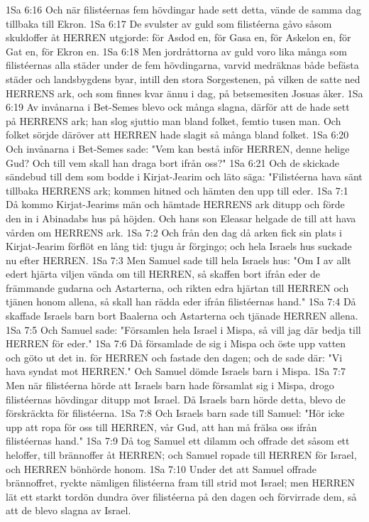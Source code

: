 1Sa 6:16  Och när filistéernas fem hövdingar hade sett detta, vände de samma dag tillbaka till Ekron.
1Sa 6:17  De svulster av guld som filistéerna gåvo såsom skuldoffer åt HERREN utgjorde: för Asdod en, för Gasa en, för Askelon en, för Gat en, för Ekron en.
1Sa 6:18  Men jordråttorna av guld voro lika många som filistéernas alla städer under de fem hövdingarna, varvid medräknas både befästa städer och landsbygdens byar, intill den stora Sorgestenen, på vilken de satte ned HERRENS ark, och som finnes kvar ännu i dag, på betsemesiten Josuas åker.
1Sa 6:19  Av invånarna i Bet-Semes blevo ock många slagna, därför att de hade sett på HERRENS ark; han slog sjuttio man bland folket, femtio tusen man. Och folket sörjde däröver att HERREN hade slagit så många bland folket.
1Sa 6:20  Och invånarna i Bet-Semes sade: "Vem kan bestå inför HERREN, denne helige Gud? Och till vem skall han draga bort ifrån oss?"
1Sa 6:21  Och de skickade sändebud till dem som bodde i Kirjat-Jearim och läto säga: "Filistéerna hava sänt tillbaka HERRENS ark; kommen hitned och hämten den upp till eder.
1Sa 7:1  Då kommo Kirjat-Jearims män och hämtade HERRENS ark ditupp och förde den in i Abinadabs hus på höjden. Och hans son Eleasar helgade de till att hava vården om HERRENS ark.
1Sa 7:2  Och från den dag då arken fick sin plats i Kirjat-Jearim förflöt en lång tid: tjugu år förgingo; och hela Israels hus suckade nu efter HERREN.
1Sa 7:3  Men Samuel sade till hela Israels hus: "Om I av allt edert hjärta viljen vända om till HERREN, så skaffen bort ifrån eder de främmande gudarna och Astarterna, och rikten edra hjärtan till HERREN och tjänen honom allena, så skall han rädda eder ifrån filistéernas hand."
1Sa 7:4  Då skaffade Israels barn bort Baalerna och Astarterna och tjänade HERREN allena.
1Sa 7:5  Och Samuel sade: "Församlen hela Israel i Mispa, så vill jag där bedja till HERREN för eder."
1Sa 7:6  Då församlade de sig i Mispa och öste upp vatten och göto ut det in. för HERREN och fastade den dagen; och de sade där: "Vi hava syndat mot HERREN." Och Samuel dömde Israels barn i Mispa.
1Sa 7:7  Men när filistéerna hörde att Israels barn hade församlat sig i Mispa, drogo filistéernas hövdingar ditupp mot Israel. Då Israels barn hörde detta, blevo de förskräckta för filistéerna.
1Sa 7:8  Och Israels barn sade till Samuel: "Hör icke upp att ropa för oss till HERREN, vår Gud, att han må frälsa oss ifrån filistéernas hand."
1Sa 7:9  Då tog Samuel ett dilamm och offrade det såsom ett heloffer, till brännoffer åt HERREN; och Samuel ropade till HERREN för Israel, och HERREN bönhörde honom.
1Sa 7:10  Under det att Samuel offrade brännoffret, ryckte nämligen filistéerna fram till strid mot Israel; men HERREN lät ett starkt tordön dundra över filistéerna på den dagen och förvirrade dem, så att de blevo slagna av Israel.
